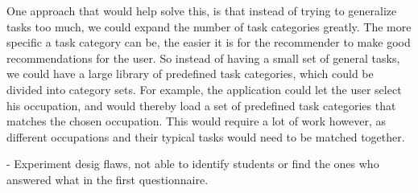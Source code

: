 One approach that would help solve this, is that instead of trying to generalize tasks too much, we could expand the number of task categories greatly. The more specific a task category can be, the easier it is for the recommender to make  good recommendations for the user. So instead of having a small set of general tasks, we could have a large library of predefined task categories, which could be divided into category sets. For example, the application could let the user select his occupation, and would thereby load a set of predefined task categories that matches the chosen occupation. This would require a lot of work however, as different occupations and their typical tasks would need to be matched together.


- Experiment desig flaws, not able to identify students or find the ones who answered what in the first questionnaire.